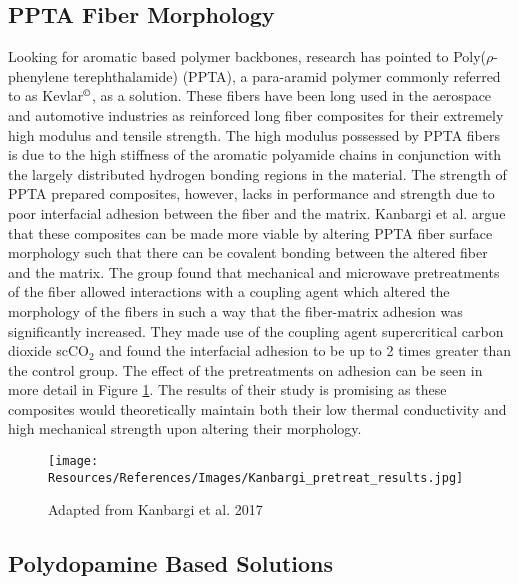 \documentclass[12pt]{article}
\begin{document}
\begin{multicols}{2}
\subsection{PPTA Fiber Morphology}
\vspace{-0.4em}
\indent Looking for aromatic based polymer backbones, research has pointed to Poly($\rho$-phenylene terephthalamide) (PPTA), a para-aramid polymer commonly referred to as Kevlar$^{\text{\textcopyright}}$, as a solution. \citep{Liu2019} These fibers have been long used in the aerospace and automotive industries as reinforced long fiber composites for their extremely high modulus and tensile strength. \cite{Cheng2005} The high modulus possessed by PPTA fibers is due to the high stiffness of the aromatic polyamide chains in conjunction with the largely distributed hydrogen bonding regions in the material. \citep{Wang2020} The strength of PPTA prepared composites, however, lacks in performance and strength due to poor interfacial adhesion between the fiber and the matrix. \citep{Kanbargi2017} Kanbargi et al. \citep{Kanbargi2017} argue that these composites can be made more viable by altering PPTA fiber surface morphology such that there can be covalent bonding between the altered fiber and the matrix. The group found that mechanical and microwave pretreatments of the fiber allowed interactions with a coupling agent which altered the morphology of the fibers in such a way that the fiber-matrix adhesion was significantly increased. They made use of the coupling agent supercritical carbon dioxide scCO$_2$ and found the interfacial adhesion to be up to 2 times greater than the control group. \citep{Kanbargi2017} The effect of the pretreatments on adhesion can be seen in more detail in Figure \ref{fig:Kanbargi_Results}. The results of their study is promising as these composites would theoretically maintain both their low thermal conductivity and high mechanical strength upon altering their morphology.

\begin{figure}[H]
    \centering
    \texttt{[image: Resources/References/Images/Kanbargi\_pretreat\_results.jpg]}
    \caption{\scriptsize{Adapted from Kanbargi et al. 2017 \citep{Kanbargi2017}}}
    \label{fig:Kanbargi_Results}
\end{figure}

\subsection{Polydopamine Based Solutions}


\end{multicols}
\end{document}
